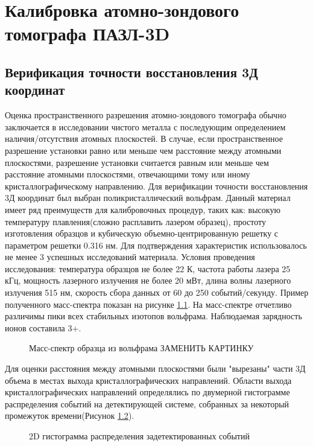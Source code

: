 \chapter{Калибровка атомно-зондового томографа ПАЗЛ-3D}\label{ch:ch3}

\section{Верификация точности восстановления 3Д координат}\label{sec:ch3/sect1}

Оценка пространственного разрешения атомно-зондового томографа обычно заключается в исследовании чистого металла с последующим определением наличия/отсутствия атомных плоскостей. В случае, если пространственное разрешение установки равно или меньше чем расстояние между атомными плоскостями, разрешение установки считается равным или меньше чем расстояние атомными плоскостями, отвечающими тому или иному кристаллографическому направлению. Для верификации точности восстановления 3Д координат был выбран поликристаллический вольфрам. Данный материал имеет ряд преимуществ для калибровочных процедур, таких как: высокую температуру плавления(сложно расплавить лазером образец), простоту изготовления образцов и кубическую объемно-центрированную решетку с параметром решетки 0.316 нм. Для подтверждения характеристик использовалось не менее 3 успешных исследований материала. Условия проведения исследования: температура образцов не более 22 К, частота работы лазера 25 кГц, мощность лазерного излучения не более 20 мВт, длина волны лазерного излучения 515 нм, скорость сбора данных от 60 до 250 событий/секунду. Пример полученного масс-спектра показан на рисунке \cref{fig:W_massspectr}. На масс-спектре отчетливо различимы пики всех стабильных изотопов вольфрама. Наблюдаемая зарядность ионов составила 3+. 

\begin{figure}[htb]
	\caption{Масс-спектр образца из вольфрама ЗАМЕНИТЬ КАРТИНКУ}
	\label{fig:W_massspectr}
\end{figure}

Для оценки расстояния между атомными плоскостями были "вырезаны" части 3Д объема в местах выхода кристаллографических направлений. Области выхода кристаллографических направлений определялись по двумерной гистограмме распределения событий на детектирующей системе, собранных за некоторый промежуток времени(Рисунок \cref{fig:W_3D}).

\begin{figure}[htb]
	\centerfloat{
		\texttt{[image: W\_3D]}
	}
	\caption{2D гистограмма распределения задетектированных событий}
	\label{fig:W_3D}
\end{figure}



